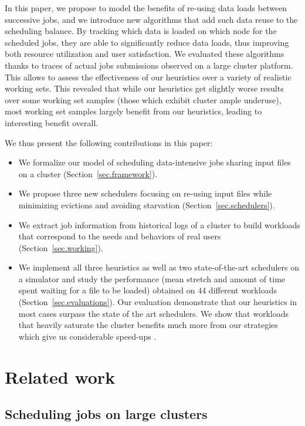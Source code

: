 \documentclass[conference,10pt]{IEEEtran}
\begin{document}
In this paper, we propose to model the benefits of re-using data loads
between successive jobs, and we introduce new algorithms that add such
data reuse to the scheduling balance. By tracking which data is loaded
on which node for the scheduled jobs, they are able to significantly
reduce data loads, thus improving both resource utilization and user
satisfaction. We evaluated these algorithms thanks to traces of actual
jobs submissions observed on a large cluster platform. This allows to
assess the effectiveness of our heuristics over a variety of realistic
working sets. This revealed that while our heuristics get slightly worse
results over some working set samples (those which exhibit cluster ample
underuse), most working set samples largely benefit from our heuristics,
leading to interesting benefit overall.

We thus present the following contributions in this paper:
\begin{itemize}
	\item We formalize our model of scheduling data-intensive jobs sharing input files on a cluster (Section~\ref{sec.framework}).
	\item We propose three new schedulers focusing on re-using input files while minimizing evictions and avoiding starvation (Section~\ref{sec.schedulers}).
	\item We extract job information from historical logs of a cluster to build workloads that correspond to the needs and behaviors of real users (Section~\ref{sec.working}).
	\item We implement all three heuristics as well as two state-of-the-art schedulers on a simulator and study the performance (mean stretch and amount of time spent waiting for a file to be loaded) obtained on 44 different workloads (Section~\ref{sec.evaluations}).
	Our evaluation demonstrate that our heuristics in most cases surpass the state of the art schedulers.
	We show that workloads that heavily saturate the cluster
                benefits much more from our strategies which give us
                considerable speed-ups .
\end{itemize}

\section{Related work}\label{sec.related_work}

\subsection{Scheduling jobs on large clusters}
\end{document}
